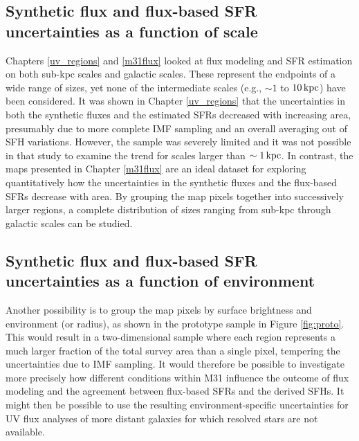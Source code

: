 \subsection{Synthetic flux and flux-based SFR uncertainties as a function of scale}

Chapters \ref{uv_regions} and \ref{m31flux} looked at flux modeling and SFR
estimation on both sub-kpc scales and galactic scales. These represent the
endpoints of a wide range of sizes, yet none of the intermediate scales (e.g.,
$\sim 1$ to $10\,\mathrm{kpc}$) have been considered. It was shown in Chapter
\ref{uv_regions} that the uncertainties in both the synthetic fluxes and the
estimated SFRs decreased with increasing area, presumably due to more complete
IMF sampling and an overall averaging out of SFH variations. However, the
sample was severely limited and it was not possible in that study to examine
the trend for scales larger than $\sim 1\,\mathrm{kpc}$. In contrast, the maps presented
in Chapter \ref{m31flux} are an ideal dataset for exploring quantitatively how
the uncertainties in the synthetic fluxes and the flux-based SFRs decrease with
area. By grouping the map pixels together into successively larger regions, a
complete distribution of sizes ranging from sub-kpc through galactic scales can
be studied.


\subsection{Synthetic flux and flux-based SFR uncertainties as a function of environment}

Another possibility is to group the map pixels by surface brightness and
environment (or radius), as shown in the prototype sample in Figure
\ref{fig:proto}. This would result in a two-dimensional sample where each
region represents a much larger fraction of the total survey area than a single
pixel, tempering the uncertainties due to IMF sampling. It would therefore be
possible to investigate more precisely how different conditions within M31
influence the outcome of flux modeling and the agreement between flux-based
SFRs and the derived SFHs. It might then be possible to use the resulting
environment-specific uncertainties for UV flux analyses of more distant
galaxies for which resolved stars are not available.


